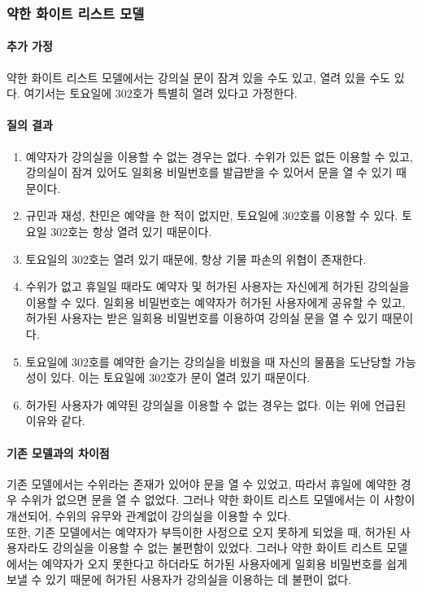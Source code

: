 \documentclass[11pt,a4paper]{article}
\begin{document}
\subsubsection{약한 화이트 리스트 모델}

\paragraph{추가 가정}
약한 화이트 리스트 모델에서는 강의실 문이 잠겨 있을 수도 있고, 열려 있을 수도 있다. 여기서는 토요일에 302호가 특별히 열려 있다고 가정한다.

\paragraph{질의 결과}
\begin{enumerate}
\item 예약자가 강의실을 이용할 수 없는 경우는 없다. 수위가 있든 없든 이용할 수 있고, 강의실이 잠겨 있어도 일회용 비밀번호를 발급받을 수 있어서 문을 열 수 있기 때문이다.
\item 규민과 재성, 찬민은 예약을 한 적이 없지만, 토요일에 302호를 이용할 수 있다. 토요일 302호는 항상 열려 있기 때문이다.
\item 토요일의 302호는 열려 있기 때문에, 항상 기물 파손의 위협이 존재한다.
\item 수위가 없고 휴일일 때라도 예약자 및 허가된 사용자는 자신에게 허가된 강의실을 이용할 수 있다. 일회용 비밀번호는 예약자가 허가된 사용자에게 공유할 수 있고, 허가된 사용자는 받은 일회용 비밀번호를 이용하여 강의실 문을 열 수 있기 때문이다.
\item 토요일에 302호를 예약한 슬기는 강의실을 비웠을 때 자신의 물품을 도난당할 가능성이 있다. 이는 토요일에 302호가 문이 열려 있기 때문이다.
\item 허가된 사용자가 예약된 강의실을 이용할 수 없는 경우는 없다. 이는 위에 언급된 이유와 같다.
\end{enumerate}

\paragraph{기존 모델과의 차이점}
\hfill\break
기존 모델에서는 수위라는 존재가 있어야 문을 열 수 있었고, 따라서 휴일에 예약한 경우 수위가 없으면 문을 열 수 없었다. 그러나 약한 화이트 리스트 모델에서는 이 사항이 개선되어, 수위의 유무와 관계없이 강의실을 이용할 수 있다.\\
또한, 기존 모델에서는 예약자가 부득이한 사정으로 오지 못하게 되었을 때, 허가된 사용자라도 강의실을 이용할 수 없는 불편함이 있었다. 그러나 약한 화이트 리스트 모델에서는 예약자가 오지 못한다고 하더라도 허가된 사용자에게 일회용 비밀번호를 쉽게 보낼 수 있기 때문에 허가된 사용자가 강의실을 이용하는 데 불편이 없다.
\end{document}
